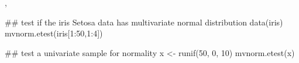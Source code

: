 \begin{SeeAlso}\relax
{},
\end{SeeAlso}
\begin{Examples}
\begin{ExampleCode}
 ## test if the iris Setosa data has multivariate normal distribution
 data(iris)
 mvnorm.etest(iris[1:50,1:4])
 
 ## test a univariate sample for normality
 x <- runif(50, 0, 10)
 mvnorm.etest(x)
 \end{ExampleCode}
\end{Examples}


